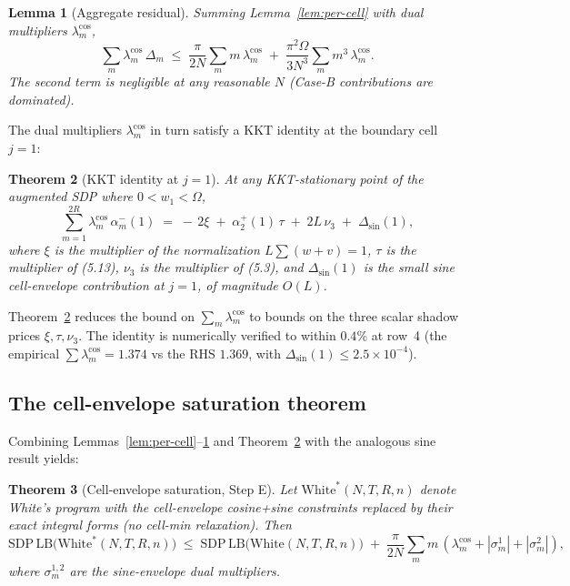 \documentclass[11pt]{article}
\theoremstyle{plain}
\newtheorem{theorem}{Theorem}
\newtheorem{lemma}[theorem]{Lemma}
\theoremstyle{definition}
\begin{document}
\begin{lemma}[Aggregate residual]\label{lem:aggregate}
Summing Lemma~\ref{lem:per-cell} with dual multipliers
$\lambda_m^{\cos}$,
\[
\sum_m \lambda_m^{\cos}\, \Delta_m \;\le\;
\frac{\pi}{2N} \sum_m m\, \lambda_m^{\cos}
\;+\;
\frac{\pi^2 \Omega}{3 N^3} \sum_m m^3\, \lambda_m^{\cos}.
\]
The second term is negligible at any reasonable $N$ (Case-B
contributions are dominated).
\end{lemma}

The dual multipliers $\lambda_m^{\cos}$ in turn satisfy a KKT identity
at the boundary cell $j=1$:

\begin{theorem}[KKT identity at $j=1$]\label{thm:kkt}
At any KKT-stationary point of the augmented SDP where $0 < w_1 < \Omega$,
\[
\sum_{m=1}^{2R} \lambda_m^{\cos}\, \alpha_m^-(1)
\;=\;
-\,2\xi \;+\; \alpha_2^+(1)\, \tau \;+\; 2 L\, \nu_3
\;+\; \Delta_{\sin}(1),
\]
where $\xi$ is the multiplier of the normalization
$L \sum (w + v) = 1$, $\tau$ is the multiplier of (5.13), $\nu_3$ is
the multiplier of (5.3), and $\Delta_{\sin}(1)$ is the small sine
cell-envelope contribution at $j=1$, of magnitude $O(L)$.
\end{theorem}

Theorem~\ref{thm:kkt} reduces the bound on $\sum_m \lambda_m^{\cos}$
to bounds on the three scalar shadow prices $\xi, \tau, \nu_3$. The
identity is numerically verified to within $0.4\%$ at row~4 (the
empirical $\sum \lambda_m^{\cos} = 1.374$ vs the RHS $1.369$, with
$\Delta_{\sin}(1) \le 2.5 \times 10^{-4}$).

\subsection{The cell-envelope saturation theorem}

Combining Lemmas~\ref{lem:per-cell}--\ref{lem:aggregate} and
Theorem~\ref{thm:kkt} with the analogous sine result yields:

\begin{theorem}[Cell-envelope saturation, Step E]\label{thm:cell-env}
Let $\mathrm{White}^*(N, T, R, n)$ denote White's program with the
cell-envelope cosine+sine constraints replaced by their exact
integral forms (no cell-min relaxation). Then
\[
\mathrm{SDP\,LB}\bigl(\mathrm{White}^*(N, T, R, n)\bigr)
\;\le\; \mathrm{SDP\,LB}\bigl(\mathrm{White}(N, T, R, n)\bigr)
\;+\; \frac{\pi}{2N} \sum_m m\, (\lambda_m^{\cos} + |\sigma_m^1| + |\sigma_m^2|),
\]
where $\sigma_m^{1,2}$ are the sine-envelope dual multipliers.
\end{theorem}
\end{document}

